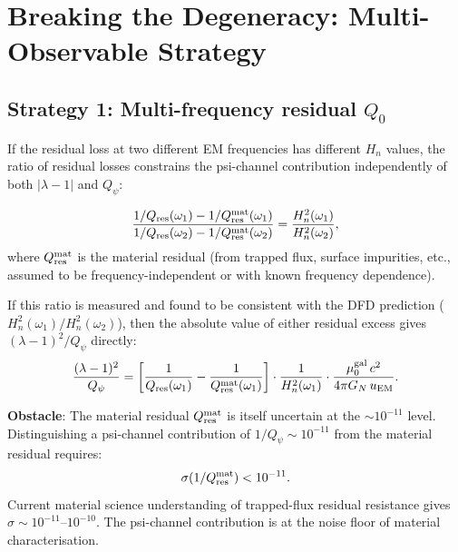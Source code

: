 \documentclass[11pt]{article}
\newcommand{\lam}{\lambda}
\newcommand{\Qpsi}{Q_\psi}
\newcommand{\Heff}{H_n}
\newcommand{\muG}{\mu_0^{\rm gal}}
\newcommand{\lbone}{|\lam - 1|}
\newcommand{\GN}{G_N}
\theoremstyle{definition}
\theoremstyle{remark}
\begin{document}
\section{Breaking the Degeneracy: Multi-Observable Strategy}
\label{sec:breaking_degeneracy}

\subsection{Strategy 1: Multi-frequency residual $Q_0$}

If the residual loss at two different EM frequencies has different
$\Heff$ values, the ratio of residual losses constrains the psi-channel
contribution independently of both $\lbone$ and $\Qpsi$:

\begin{equation}
\frac{1/Q_{\rm res}(\omega_1) - 1/Q_{\rm res}^{\rm mat}(\omega_1)}
{1/Q_{\rm res}(\omega_2) - 1/Q_{\rm res}^{\rm mat}(\omega_2)}
= \frac{\Heff^2(\omega_1)}{\Heff^2(\omega_2)},
\label{eq:multi_freq_ratio}
\end{equation}
where $Q_{\rm res}^{\rm mat}$ is the material residual (from trapped
flux, surface impurities, etc., assumed to be frequency-independent
or with known frequency dependence).

If this ratio is measured and found to be consistent with the DFD
prediction ($\Heff^2(\omega_1)/\Heff^2(\omega_2)$), then the absolute
value of either residual excess gives $(\lam-1)^2/\Qpsi$ directly:
\begin{equation}
\frac{(\lam-1)^2}{\Qpsi} = \left[\frac{1}{Q_{\rm res}(\omega_1)}
- \frac{1}{Q_{\rm res}^{\rm mat}(\omega_1)}\right]
\cdot\frac{1}{\Heff^2(\omega_1)}\cdot\frac{\muG\,c^2}
{4\pi\GN\,u_{\rm EM}}.
\label{eq:Qpsi_multi_freq}
\end{equation}

\textbf{Obstacle}: The material residual $Q_{\rm res}^{\rm mat}$ is
itself uncertain at the $\sim 10^{-11}$ level. Distinguishing a
psi-channel contribution of $1/Q_\psi \sim 10^{-11}$ from the
material residual requires:
\begin{equation}
\sigma(1/Q_{\rm res}^{\rm mat}) < 10^{-11}.
\end{equation}
Current material science understanding of trapped-flux residual
resistance gives $\sigma \sim 10^{-11}$--$10^{-10}$. The psi-channel
contribution is at the noise floor of material characterisation.
\end{document}
